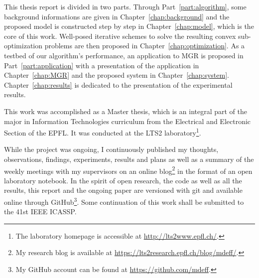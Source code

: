 \documentclass[a4paper,12pt,oneside]{report}
\newcommand{\partref}[1]{Part~\ref{part:#1}}
\newcommand{\chapref}[1]{Chapter~\ref{chap:#1}}
\begin{document}

This thesis report is divided in two parts. Through \partref{algorithm},
some background informations are given in \chapref{background} and the proposed model is constructed step by step in \chapref{model}, which is the core of this work. Well-posed iterative schemes to solve the resulting convex sub-optimization problems are then proposed in \chapref{optimization}.%
As a testbed of our algorithm's performance, an application to \gls{MGR} is proposed in \partref{application} with a presentation of the application in \chapref{MGR} and the proposed system in \chapref{system}.
\chapref{results} is dedicated to the presentation of the experimental results.

This work was accomplished as a Master thesis, which is an integral part of the major in Information Technologies curriculum from the Electrical and Electronic Section of the \gls{EPFL}. It was conducted at the LTS2 laboratory\footnote{The laboratory homepage is accessible at \url{http://lts2www.epfl.ch/}.}.

While the project was ongoing, I continuously published my thoughts, observations, findings, experiments, results and plans as well as a summary of the weekly meetings with my supervisors on an online blog\footnote{My research blog is available at \url{https://lts2research.epfl.ch/blog/mdeff/}.} in the format of an open laboratory notebook. In the spirit of open research, the code as well as all the results, this report and the ongoing paper are versioned with git and available online through GitHub\footnote{My GitHub account can be found at \url{https://github.com/mdeff}.}. Some continuation of this work shall be submitted to the 41st IEEE \gls{ICASSP}.









\end{document}
